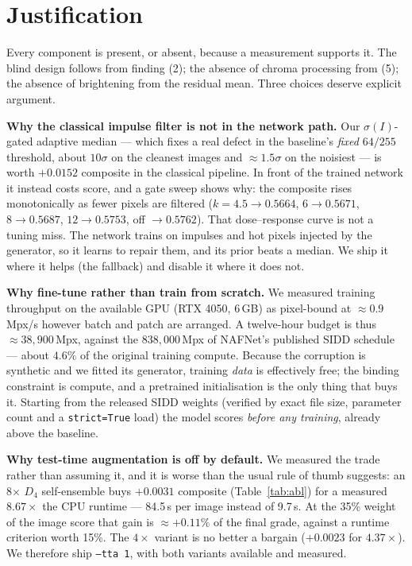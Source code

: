 \section{Justification}

Every component is present, or absent, because a measurement supports it. The blind
design follows from finding (2); the absence of chroma processing from (5); the absence
of brightening from the residual mean. Three choices deserve explicit argument.

\textbf{Why the classical impulse filter is not in the network path.} Our
$\sigma(I)$-gated adaptive median --- which fixes a real defect in the baseline's
\emph{fixed} $64/255$ threshold, about $10\sigma$ on the cleanest images and
$\approx1.5\sigma$ on the noisiest --- is worth $+0.0152$ composite in the classical
pipeline. In front of the trained network it instead costs score, and a gate sweep shows
why: the composite rises monotonically as fewer pixels are filtered
($k=4.5\to0.5664$, $6\to0.5671$, $8\to0.5687$, $12\to0.5753$, off $\to0.5762$). That
dose--response curve is not a tuning miss. The network trains on impulses and hot pixels
injected by the generator, so it learns to repair them, and its prior beats a median. We
ship it where it helps (the fallback) and disable it where it does not.

\textbf{Why fine-tune rather than train from scratch.} We measured training throughput
on the available GPU (RTX 4050, 6\,GB) as pixel-bound at $\approx0.9$\,Mpx/s however
batch and patch are arranged. A twelve-hour budget is thus $\approx38{,}900$\,Mpx,
against the $838{,}000$\,Mpx of NAFNet's published SIDD schedule --- about $4.6\%$ of
the original training compute. Because the corruption is synthetic and we fitted its
generator, training \emph{data} is effectively free; the binding constraint is compute,
and a pretrained initialisation is the only thing that buys it. Starting from the
released SIDD weights (verified by exact file size, parameter count and a
\texttt{strict=True} load) the model scores \ZeroShotComp{} \emph{before any training},
already above the \BaseComp{} baseline.

\textbf{Why test-time augmentation is off by default.} We measured the trade rather than
assuming it, and it is worse than the usual rule of thumb suggests: an 8$\times$ $D_4$
self-ensemble buys $+0.0031$ composite (Table~\ref{tab:abl}) for a measured
$8.67\times$ the CPU runtime --- 84.5\,s per image instead of 9.7\,s. At the 35\% weight
of the image score that gain is $\approx+0.11\%$ of the final grade, against a runtime
criterion worth 15\%. The $4\times$ variant is no better a bargain ($+0.0023$ for
$4.37\times$). We therefore ship \texttt{--tta 1}, with both variants available and
measured.

